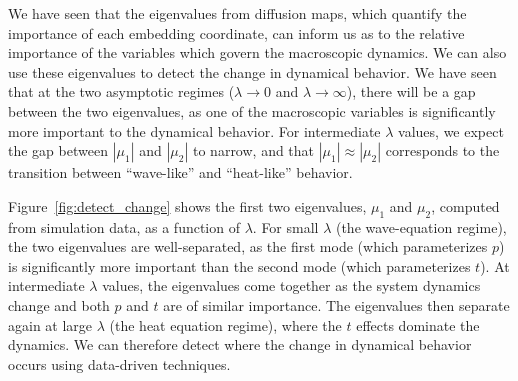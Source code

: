 \documentclass[prl, reprint, final, showkeys]{revtex4-1}
\begin{document}

We have seen that the eigenvalues from diffusion maps, which quantify the importance of each embedding coordinate, can inform us as to the relative importance of the variables which govern the macroscopic dynamics.
%
We can also use these eigenvalues to detect the change in dynamical behavior.
%
We have seen that at the two asymptotic regimes ($\lambda \rightarrow 0$ and $\lambda \rightarrow \infty$), there will be a gap between the two eigenvalues, as one of the macroscopic variables is significantly more important to the dynamical behavior.
%
For intermediate $\lambda$ values, we expect the gap between $|\mu_1|$ and $|\mu_2|$ to narrow, and that $|\mu_1| \approx |\mu_2|$ corresponds to the transition between ``wave-like'' and ``heat-like'' behavior. 

Figure~\ref{fig:detect_change} shows the first two eigenvalues, $\mu_1$ and $\mu_2$, computed from simulation data, as a function of $\lambda$.
% 
%
For small $\lambda$ (the wave-equation regime), the two eigenvalues are well-separated, as the first mode (which parameterizes $p$) is significantly more important than the second mode (which parameterizes $t$).
%
At intermediate $\lambda$ values, the eigenvalues come together as the system dynamics change and both $p$ and $t$ are of similar importance.
%
The eigenvalues then separate again at large $\lambda$ (the heat equation regime), where the $t$ effects dominate the dynamics.
%
We can therefore detect where the change in dynamical behavior occurs using data-driven techniques.
\end{document}
